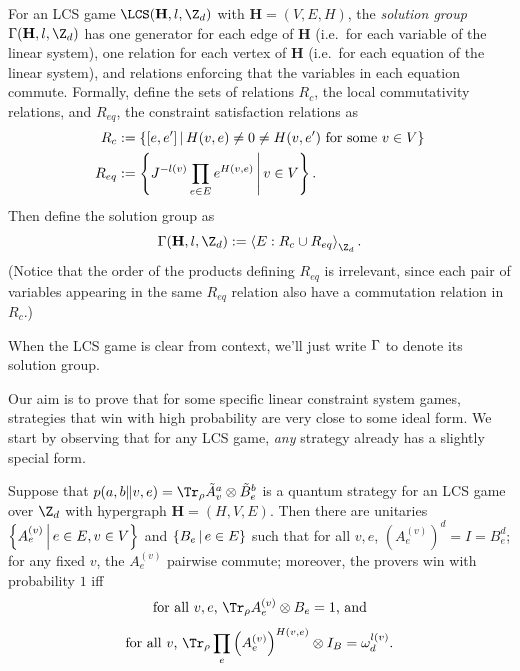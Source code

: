 \begin{definition}
	For an LCS game $\LCS(\mathbf H, l, \Z_d)$ with $\mathbf H = (V,E,H)$, the \emph{solution group} $\G(\mathbf H, l, \Z_d)$ has one generator for each edge of $\mathbf H$ (i.e.\ for each variable of the linear system), one relation for each vertex of $\mathbf H$ (i.e.\ for each equation of the linear system), and relations enforcing that the variables in each equation commute. Formally, define the sets of relations $R_c$, the local commutativity relations, and $R_{eq}$, the constraint satisfaction relations as
	\begin{align}
		R_{c} 		&:= \left\{[e,e'] \,\middle\vert\, H(v,e) \neq 0 \neq H(v,e')\text{ for some } v\in V\right\}
		\\R_{eq}	&:= \left\{ J^{-l(v)}\prod_{e\in E}e^{H(v,e)} \,\middle\vert\, v\in V\right\}.
	\end{align}
Then define the solution group as
\begin{equation}
	\G(\mathbf H, l, \Z_d) := \Braket{E:R_{c}\cup R_{eq}}_{\Z_d}.
\end{equation}
(Notice that the order of the products defining $R_{eq}$ is irrelevant, since each pair of variables appearing in the same $R_{eq}$ relation also have a commutation relation in $R_c$.)
\end{definition}
When the LCS game is clear from context, we'll just write $\Gamma$ to denote its solution group. 


Our aim is to prove that for some specific linear constraint system games, strategies that win with high probability are very close to some ideal form.
We start by observing that for any LCS game, \emph{any} strategy already has a slightly special form.

\begin{lemma}\label{lemma:unitary-observable-strategy-exact}
	Suppose that $p(a,b\|v,e) =\Tr_\rho \tilde A_v^a\otimes \tilde B_e^b$ is a quantum strategy for an LCS game over $\Z_d$ with hypergraph $\mathbf H = (H,V,E)$. Then there are unitaries $\left\{A_e^{(v)} \,\middle\vert\, e\in E, v\in V\right\}$ and $\left\{B_e \,\middle\vert\, e\in E\right\}$ such that for all $v,e$, $(A_e^{(v)})^d = I = B_e^d$; for any fixed $v$, the $A_e^{(v)}$ pairwise commute; moreover, the provers win with probability $1$ iff 
	\begin{equation}\label{eq:exact-win-criterion-con}
		\text{for all $v,e$, }\Tr_\rho A_e^{(v)}\otimes B_e  = 1\text{, and}
	\end{equation}
	\begin{equation}\label{eq:exact-win-criterion-sat}
		\text{for all }v\text{, }\Tr_\rho \prod_{e}\left(A_e^{(v)}\right)^{H(v,e)}\otimes I_B = \w_d^{l(v)}.
	\end{equation}
\end{lemma}

